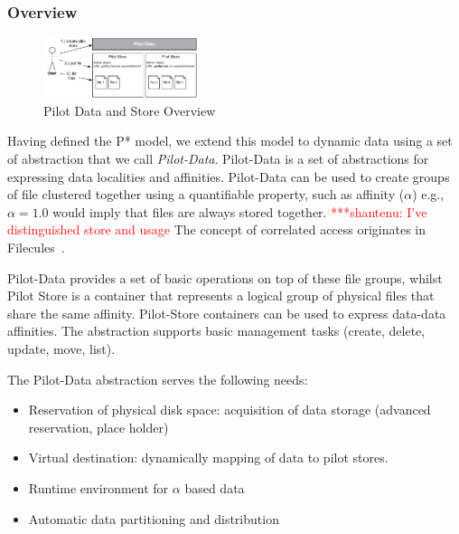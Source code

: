 \documentclass[conference,final]{IEEEtran}
\newcommand{\jhanote}[1]{ {\textcolor{red} { ***shantenu: #1 }}}
\newcommand{\jhanote}[1]{}
\begin{document}

\subsubsection{Overview}

\begin{figure}[t]
    \centering
        \includegraphics[width=0.4\textwidth]{figures/pilotstore.pdf}
    \caption{Pilot Data and Store Overview}
    \label{fig:figures_pilotstore}
\end{figure}

Having defined the P* model, we extend this model to dynamic data using a set of 
abstraction that we call \emph{Pilot-Data}. Pilot-Data is a set of abstractions 
for expressing data localities and affinities. Pilot-Data can be used to create 
groups of file clustered together using a quantifiable property, such as 
affinity ($\alpha$) e.g., $\alpha = 1.0$ would imply that files are always 
stored together. \jhanote{I've distinguished store and usage} The concept of
correlated access originates in 
Filecules~\cite{Doraimani:2008:FGS:1383422.1383429}.


Pilot-Data provides a set of basic operations on top of these file
groups, whilst Pilot Store is a container that represents a logical
group of physical files that share the same affinity. Pilot-Store 
containers can be used to express data-data affinities. The abstraction 
supports basic management tasks (create, delete, update,
move, list). 

The Pilot-Data abstraction serves the following needs:
\begin{itemize}
	\item Reservation of physical disk space: acquisition of data storage (advanced reservation, place holder)
	\item Virtual destination: dynamically mapping of data to pilot stores.
	\item Runtime environment for $\alpha$ based data
	\item Automatic data partitioning and distribution
\end{itemize}
\end{document}
